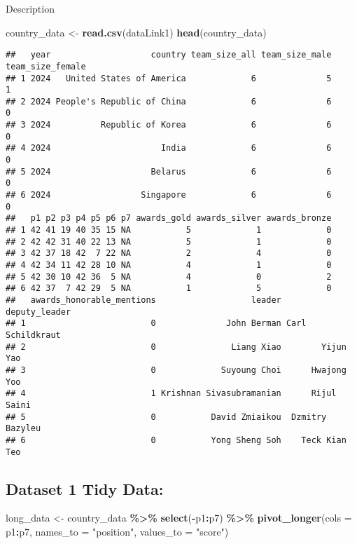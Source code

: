 \documentclass[
]{article}
\newenvironment{Shaded}{\begin{snugshade}}{\end{snugshade}}
\newcommand{\AttributeTok}[1]{\textcolor[rgb]{0.13,0.29,0.53}{#1}}
\newcommand{\FunctionTok}[1]{\textcolor[rgb]{0.13,0.29,0.53}{\textbf{#1}}}
\newcommand{\NormalTok}[1]{#1}
\newcommand{\OtherTok}[1]{\textcolor[rgb]{0.56,0.35,0.01}{#1}}
\newcommand{\SpecialCharTok}[1]{\textcolor[rgb]{0.81,0.36,0.00}{\textbf{#1}}}
\newcommand{\StringTok}[1]{\textcolor[rgb]{0.31,0.60,0.02}{#1}}
\begin{document}
Description

\begin{Shaded}
\begin{Highlighting}[]
\NormalTok{country\_data }\OtherTok{\textless{}{-}} \FunctionTok{read.csv}\NormalTok{(dataLink1)}
\FunctionTok{head}\NormalTok{(country\_data)}
\end{Highlighting}
\end{Shaded}

\begin{verbatim}
##   year                    country team_size_all team_size_male team_size_female
## 1 2024   United States of America             6              5                1
## 2 2024 People's Republic of China             6              6                0
## 3 2024          Republic of Korea             6              6                0
## 4 2024                      India             6              6                0
## 5 2024                    Belarus             6              6                0
## 6 2024                  Singapore             6              6                0
##   p1 p2 p3 p4 p5 p6 p7 awards_gold awards_silver awards_bronze
## 1 42 41 19 40 35 15 NA           5             1             0
## 2 42 42 31 40 22 13 NA           5             1             0
## 3 42 37 18 42  7 22 NA           2             4             0
## 4 42 34 11 42 28 10 NA           4             1             0
## 5 42 30 10 42 36  5 NA           4             0             2
## 6 42 37  7 42 29  5 NA           1             5             0
##   awards_honorable_mentions                   leader    deputy_leader
## 1                         0              John Berman Carl Schildkraut
## 2                         0               Liang Xiao        Yijun Yao
## 3                         0             Suyoung Choi      Hwajong Yoo
## 4                         1 Krishnan Sivasubramanian      Rijul Saini
## 5                         0           David Zmiaikou  Dzmitry Bazyleu
## 6                         0           Yong Sheng Soh    Teck Kian Teo
\end{verbatim}

\subsection{Dataset 1 Tidy Data:}\label{dataset-1-tidy-data}

\begin{Shaded}
\begin{Highlighting}[]
\NormalTok{long\_data }\OtherTok{\textless{}{-}}\NormalTok{ country\_data }\SpecialCharTok{\%\textgreater{}\%}
  \FunctionTok{select}\NormalTok{(}\SpecialCharTok{{-}}\NormalTok{p1}\SpecialCharTok{:}\NormalTok{p7) }\SpecialCharTok{\%\textgreater{}\%}
  \FunctionTok{pivot\_longer}\NormalTok{(}\AttributeTok{cols =}\NormalTok{ p1}\SpecialCharTok{:}\NormalTok{p7, }\AttributeTok{names\_to =} \StringTok{"position"}\NormalTok{, }\AttributeTok{values\_to =} \StringTok{"score"}\NormalTok{)}
\end{Highlighting}
\end{Shaded}
\end{document}
